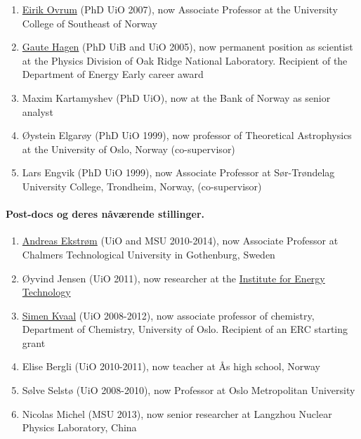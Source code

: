 \documentclass[aps,floatfix,preprint]{revtex4-1}
\begin{document}
\begin{enumerate}
\item \href{{https://www.hbv.no/om-hbv-kontakt-oss-ansatte/eirik-ovrum-article125026-6688.html}}{Eirik Ovrum} (PhD UiO 2007), now Associate Professor at the University College of Southeast of Norway

\item \href{{https://www.ornl.gov/staff-profile/gaute-hagen}}{Gaute Hagen} (PhD UiB and UiO 2005), now permanent position as scientist at the Physics Division of Oak Ridge National Laboratory. Recipient of the Department of Energy Early career award

\item Maxim Kartamyshev (PhD UiO), now at the Bank of Norway as senior analyst

\item Øystein Elgarøy (PhD UiO 1999), now professor of Theoretical Astrophysics at the University of Oslo, Norway (co-supervisor)

\item Lars Engvik (PhD UiO 1999), now Associate Professor at Sør-Trøndelag University College, Trondheim, Norway, (co-supervisor)
\end{enumerate}

\noindent
\paragraph*{Post-docs og deres nåværende stillinger.}
\begin{enumerate}
\item \href{{https://www.chalmers.se/en/Staff/Pages/Andreas-Ekstrom.aspx}}{Andreas Ekstrøm} (UiO and MSU 2010-2014), now Associate Professor  at Chalmers Technological University in Gothenburg, Sweden

\item Øyvind Jensen (UiO 2011), now researcher at the \href{{https://www.ife.no/en}}{Institute for Energy Technology}

\item \href{{http://www.mn.uio.no/kjemi/english/people/aca/simenkv/index.html}}{Simen Kvaal} (UiO 2008-2012), now associate professor of chemistry, Department of Chemistry, University of Oslo. Recipient of an ERC starting grant

\item Elise Bergli (UiO 2010-2011), now teacher at Ås high school, Norway

\item Sølve Selstø (UiO 2008-2010), now  Professor at Oslo Metropolitan University

\item Nicolas Michel (MSU 2013), now senior researcher at Langzhou Nuclear Physics Laboratory, China
\end{enumerate}
\end{document}
